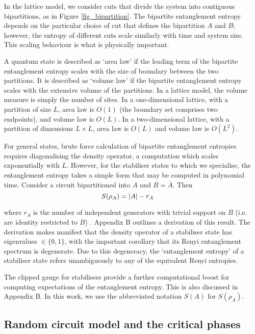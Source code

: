 \documentclass[10pt]{article}
\begin{document}
In the lattice model, we consider cuts that divide the system into contiguous bipartitions, as in Figure \ref{fig_bipartition}. The bipartite entanglement entropy depends on the particular choice of cut that defines the bipartition $A$ and $B$; however, the entropy of different cuts scale similarly with time and system size. This scaling behaviour is what is physically important.

A quantum state is described as `area law' if the leading term of the bipartite entanglement entropy scales with the size of boundary between the two partitions. It is described as `volume law' if the bipartite entanglement entropy scales with the extensive volume of the partitions. In a lattice model, the volume measure is simply the number of sites. In a one-dimensional lattice, with a partition of size $L$, area law is $O(1)$ (the boundary set comprises two endpoints), and volume law is $O(L)$. In a two-dimensional lattice, with a partition of dimensions $L\times L$, area law is $O(L)$ and volume law is $O(L^2)$. 

For general states, brute force calculation of bipartite entanglement entropies requires diagonalising the density operator, a computation which scales exponentially with $L$. However, for the stabiliser states to which we specialise, the entanglement entropy takes a simple form that may be computed in polynomial time. Consider a circuit bipartitioned into $A$ and $B=\bar{A}$. Then
\begin{equation}
S(\rho_A) = \abs{A} - r_A
\end{equation}

where $r_A$ is the number of independent generators with trivial support on $B$ (i.e. are identity restricted to $B$) \cite{li2019measurement, nahum2017quantum}. Appendix B outlines a derivation of this result. The derivation makes manifest that the density operator of a stabiliser state has eigenvalues $\in \{0,1\}$, with the important corollary that its Renyi entanglement spectrum is degenerate. Due to this degeneracy, the `entanglement entropy' of a stabiliser state refers unambiguously to any of the equivalent Renyi entropies. 

The clipped gauge for stabilisers provide a further computational boost for computing expectations of the entanglement entropy. This is also discussed in Appendix B. In this work, we use the abbreviated notation $S(A)$ for $S(\rho_A)$.



\subsection{Random circuit model and the critical phases}
\end{document}
